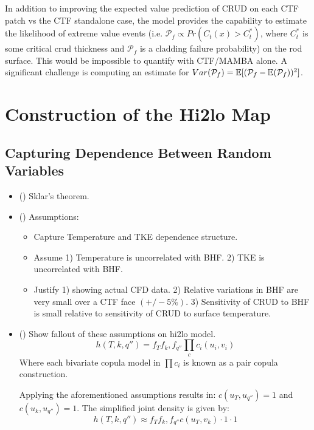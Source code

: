 In addition to improving the expected value prediction of CRUD on each CTF patch vs the CTF standalone case, the model provides the capability to estimate the likelihood of extreme value events (i.e. $\mathcal P_f \propto Pr(C_t(x) > C_t^*)$, where $C_t^*$ is some critical crud thickness and $\mathcal P_f$ is a cladding failure probability) on the rod surface.  This would be impossible to quantify with CTF/MAMBA alone.  A significant challenge is computing an estimate for $Var(\mathcal P_f) = \operatorname*{\mathbb{E}}[(\mathcal P_f - \operatorname*{\mathbb{E}}(\mathcal P_f))^2]$.


\section{Construction of the Hi2lo Map}

\subsection{Capturing Dependence Between Random Variables}
\begin{itemize}
        \item (\checkmark) Sklar's theorem.
        \item (\checkmark) Assumptions:
        \begin{itemize}
                \item Capture Temperature and TKE dependence structure.
                \item Assume 1) Temperature is uncorrelated with BHF.  2) TKE is uncorrelated with BHF.
                \item Justify 1) showing actual CFD data. 2) Relative variations in BHF are very small over a CTF face $(+/- 5\%)$.  3) Sensitivity of CRUD to BHF is small relative to sensitivity of CRUD to surface temperature.
        \end{itemize}
        \item (\checkmark) Show fallout of these assumptions on hi2lo model.
        \begin{equation}
                h(T, k, q'') = f_T f_k, f_{q''} \prod_c c_i(u_i, v_i)
        \end{equation}
        Where each bivariate copula model in $\prod c_i $ is known as a pair copula construction.

        Applying the aforementioned assumptions results in: $c(u_T, u_{q''}) = 1$ and $c(u_{k}, u_{q''}) = 1$. The simplified joint density is given by:
        \begin{equation}
                h(T, k, q'') \approx  f_T f_k, f_{q''} c(u_{T}, v_{k})  \cdot 1 \cdot 1
    \end{equation}
\end{itemize}


